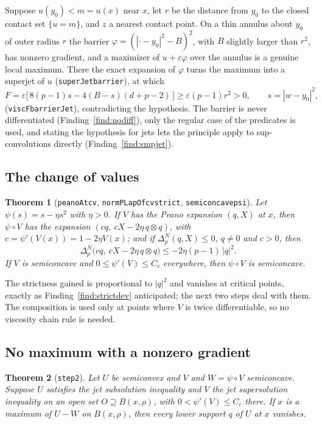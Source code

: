 \documentclass[11pt,reqno]{amsart}
\newcommand{\LEANREF}[1]{\texttt{\small\def\_{\textunderscore\allowbreak}#1}}
\newcommand{\eps}{\varepsilon}
\newcommand{\pnlap}{\Delta_p^{N}}
\theoremstyle{plain}
\newtheorem{theorem}{Theorem}[section]
\theoremstyle{definition}
\begin{document}
Suppose $u(y_0) < m = u(x)$ near $x$, let $r$ be the distance from $y_0$ to the
closed contact set $\{u = m\}$, and $z$ a nearest contact point. On a thin
annulus about $y_0$ of outer radius $r$ the barrier
$\varphi = (|\cdot - y_0|^2 - B)^2$, with $B$ slightly larger than $r^2$, has
nonzero gradient, and a maximizer of $u + \eps\varphi$ over the annulus is a
genuine local maximum. There the exact expansion of $\varphi$ turns the
maximum into a superjet of $u$ (\LEANREF{superJet\_barrier}), at which
\[
  F = \eps\bigl[\,8(p - 1)s - 4(B - s)(d + p - 2)\,\bigr] \ge \eps(p-1)r^2 > 0,
  \qquad s = |w - y_0|^2,
\]
(\LEANREF{viscF\_barrierJet}), contradicting the hypothesis. The barrier is never
differentiated (Finding~\ref{find:nodiff}), only the regular case of the
predicates is used, and stating the hypothesis for jets lets the principle
apply to sup-convolutions directly (Finding~\ref{find:smpjet}).

\subsection{The change of values}\label{ssec:cv}

\begin{theorem}[\LEANREF{peanoAt\_cv}, \LEANREF{normPLapOf\_cv\_strict},
\LEANREF{semiconcave\_psi}]\label{thm:cv}
Let $\psi(s) = s - \eta s^2$ with $\eta > 0$. If $V$ has the Peano expansion
$(q, X)$ at $x$, then $\psi \circ V$ has the expansion
$(c q,\ cX - 2\eta\, q \otimes q)$, with $c = \psi'(V(x)) = 1 - 2\eta V(x)$; and
if $\pnlap(q, X) \le 0$, $q \ne 0$ and $c > 0$, then
\[
  \pnlap\bigl(c q,\ cX - 2\eta\, q\otimes q\bigr) \le -2\eta(p - 1)\,|q|^2 .
\]
If $V$ is semiconcave and $0 \le \psi'(V) \le C_c$ everywhere, then
$\psi \circ V$ is semiconcave.
\end{theorem}

The strictness gained is proportional to $|q|^2$ and vanishes at critical points,
exactly as Finding~\ref{find:strictdev} anticipated; the next two steps deal
with them. The composition is used only at points where $V$ is twice
differentiable, so no viscosity chain rule is needed.

\subsection{No maximum with a nonzero gradient}\label{ssec:step2}

\begin{theorem}[\LEANREF{step2}]\label{thm:step2}
Let $U$ be semiconvex and $V$ and $W = \psi \circ V$ semiconcave. Suppose $U$
satisfies the jet subsolution inequality and $V$ the jet supersolution
inequality on an open set $O \supseteq B(x, \rho)$, with
$0 < \psi'(V) \le C_c$ there. If $x$ is a maximum of $U - W$ on $B(x, \rho)$,
then every lower support $q$ of $U$ at $x$ vanishes.
\end{theorem}
\end{document}
